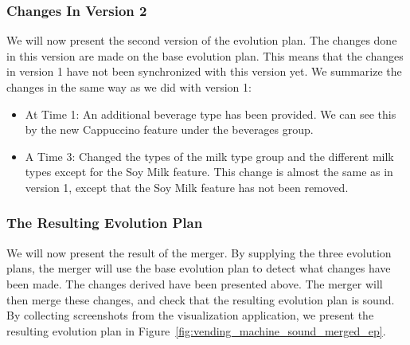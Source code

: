 \documentclass[a4paper,english]{ifimaster}
\begin{document}
\subsubsection{Changes In Version 2}%
\label{ssub:changes_in_version_2}

We will now present the second version of the evolution plan. The changes done in this version are made on the base evolution plan. This means that the changes in version 1 have not been synchronized with this version yet. We summarize the changes in the same way as we did with version 1:

\begin{itemize}
  \item At Time 1: An additional beverage type has been provided. We can see this by the new Cappuccino feature under the beverages group.
  \item A Time 3: Changed the types of the milk type group and the different milk types except for the Soy Milk feature. This change is almost the same as in version 1, except that the Soy Milk feature has not been removed.
\end{itemize}

\subsubsection{The Resulting Evolution Plan}%
\label{ssub:the_resulting_evolution_plan}

We will now present the result of the merger. By supplying the three evolution plans, the merger will use the base evolution plan to detect what changes have been made. The changes derived have been presented above. The merger will then merge these changes, and check that the resulting evolution plan is sound. By collecting screenshots from the visualization application, we present the resulting evolution plan in Figure~\vref{fig:vending_machine_sound_merged_ep}.
\end{document}
